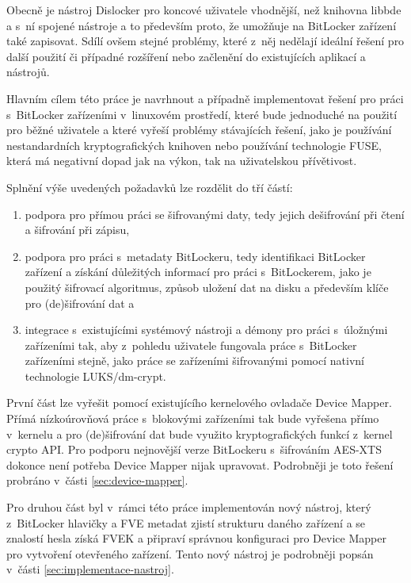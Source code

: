 Obecně je nástroj Dislocker pro koncové uživatele vhodnější, než knihovna libbde a s~ní spojené nástroje a to především proto, že umožňuje na BitLocker zařízení také zapisovat. Sdílí ovšem stejné problémy, které z~něj nedělají ideální řešení pro další použití či případné rozšíření nebo začlenění do existujících aplikací a nástrojů.




Hlavním cílem této práce je navrhnout a případně implementovat řešení pro práci s~BitLocker zařízeními v~linuxovém prostředí, které bude jednoduché na použití pro běžné uživatele a které vyřeší problémy stávajících řešení, jako je používání nestandardních kryptografických knihoven nebo používání technologie FUSE, která má negativní dopad jak na výkon, tak na uživatelskou přívětivost.

Splnění výše uvedených požadavků lze rozdělit do tří částí:

\begin{enumerate}
	\item podpora pro přímou práci se šifrovanými daty, tedy jejich dešifrování při čtení a šifrování při zápisu,
	\item podpora pro práci s~metadaty BitLockeru, tedy identifikaci BitLocker zařízení a získání důležitých informací pro práci s~BitLockerem, jako je použitý šifrovací algoritmus, způsob uložení dat na disku a především klíče pro (de)šifrování dat a
	\item integrace s~existujícími systémový nástroji a démony pro práci s~úložnými zařízeními tak, aby z~pohledu uživatele fungovala práce s~BitLocker zařízeními stejně, jako práce se zařízeními šifrovanými pomocí nativní technologie LUKS/dm-crypt.
\end{enumerate}

První část lze vyřešit pomocí existujícího kernelového ovladače Device Mapper. Přímá nízkoúrovňová práce s~blokovými zařízeními tak bude vyřešena přímo v~kernelu a pro (de)šifrování dat bude využito kryptografických funkcí z~kernel crypto API. Pro podporu nejnovější verze BitLockeru s~šifrováním AES-XTS dokonce není potřeba Device Mapper nijak upravovat. Podrobněji je toto řešení probráno v~části \ref{sec:device-mapper}.

Pro druhou část byl v~rámci této práce implementován nový nástroj, který z~BitLocker hlavičky a FVE metadat zjistí strukturu daného zařízení a se znalostí hesla získá FVEK a připraví správnou konfiguraci pro Device Mapper pro vytvoření otevřeného zařízení. Tento nový nástroj je podrobněji popsán v~části \ref{sec:implementace-nastroj}.

